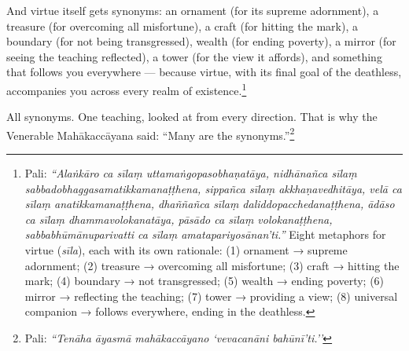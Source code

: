And virtue itself gets synonyms: an ornament (for its supreme adornment), a treasure (for overcoming all misfortune), a craft (for hitting the mark), a boundary (for not being transgressed), wealth (for ending poverty), a mirror (for seeing the teaching reflected), a tower (for the view it affords), and something that follows you everywhere --- because virtue, with its final goal of the deathless, accompanies you across every realm of existence.\footnote{Pali: \textit{``Alaṅkāro ca sīlaṃ uttamaṅgopasobhaṇatāya, nidhānañca sīlaṃ sabbadobhaggasamatikkamanaṭṭhena, sippañca sīlaṃ akkhaṇavedhitāya, velā ca sīlaṃ anatikkamanaṭṭhena, dhaññañca sīlaṃ daliddopacchedanaṭṭhena, ādāso ca sīlaṃ dhammavolokanatāya, pāsādo ca sīlaṃ volokanaṭṭhena, sabbabhūmānuparivatti ca sīlaṃ amatapariyosānan'ti.''} Eight metaphors for virtue (\textit{sīla}), each with its own rationale: (1) ornament → supreme adornment; (2) treasure → overcoming all misfortune; (3) craft → hitting the mark; (4) boundary → not transgressed; (5) wealth → ending poverty; (6) mirror → reflecting the teaching; (7) tower → providing a view; (8) universal companion → follows everywhere, ending in the deathless.}

All synonyms. One teaching, looked at from every direction. That is why the Venerable Mahākaccāyana said: ``Many are the synonyms.''\footnote{Pali: \textit{``Tenāha āyasmā mahākaccāyano `vevacanāni bahūnī'ti.''}}

